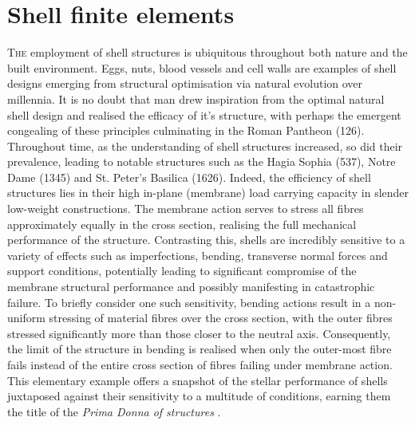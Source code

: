 



\chapter{Shell finite elements}
\label{chap:chapter_2}

\renewcommand{\Thema}{Shell finite elements}

\lettrine[lines=2]{T}{he} employment of shell structures is ubiquitous throughout both nature and the built environment. Eggs, nuts, blood vessels and cell walls are examples of shell designs emerging from structural optimisation via natural evolution over millennia. It is no doubt that man drew inspiration from the optimal natural shell design and realised the efficacy of it's structure, with perhaps the emergent congealing of these principles culminating in the Roman Pantheon (126).  Throughout time, as the understanding of shell structures increased, so did their prevalence, leading to notable structures such as the Hagia Sophia (537), Notre Dame (1345) and St. Peter's Basilica (1626). Indeed, the efficiency of shell structures lies in their high in-plane (membrane) load carrying capacity in slender low-weight constructions. The membrane action serves to stress all fibres approximately equally in the cross section, realising the full mechanical performance of the structure. Contrasting this, shells are incredibly sensitive to a variety of effects such as imperfections, bending, transverse normal forces and support conditions, potentially leading to significant compromise of the membrane structural performance and possibly manifesting in catastrophic failure. To briefly consider one such sensitivity, bending actions result in a non-uniform stressing of material fibres over the cross section, with the outer fibres stressed significantly more than those closer to the neutral axis. Consequently, the limit of the structure in bending is realised when only the outer-most fibre fails instead of the entire cross section of fibres failing under membrane action. This elementary example offers a snapshot of the stellar performance of shells juxtaposed against their sensitivity to a multitude of conditions, earning them the title of the \textit{Prima Donna of structures} \cite{Ram16}.

